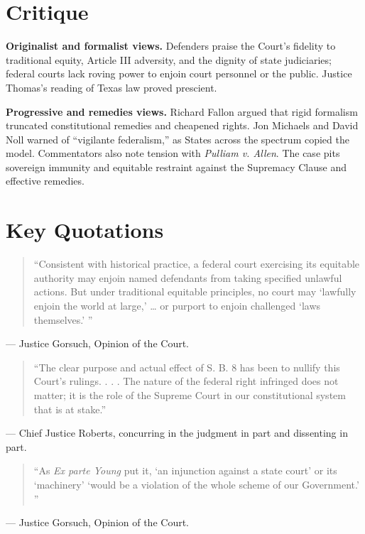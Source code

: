 \documentclass[12pt]{article}
\begin{document}
\section{Critique}

\textbf{Originalist and formalist views.} Defenders praise the Court's fidelity to traditional equity, Article III adversity, and the dignity of state judiciaries; federal courts lack roving power to enjoin court personnel or the public. Justice Thomas's reading of Texas law proved prescient.

\textbf{Progressive and remedies views.} Richard Fallon argued that rigid formalism truncated constitutional remedies and cheapened rights. Jon Michaels and David Noll warned of ``vigilante federalism,'' as States across the spectrum copied the model. Commentators also note tension with \textit{Pulliam v. Allen}. The case pits sovereign immunity and equitable restraint against the Supremacy Clause and effective remedies.

\section{Key Quotations}

\begin{quote}
``Consistent with historical practice, a federal court exercising its equitable authority may enjoin named defendants from taking specified unlawful actions. But under traditional equitable principles, no court may `lawfully enjoin the world at large,' \dots{} or purport to enjoin challenged `laws themselves.' ''
\end{quote}
\noindent --- Justice Gorsuch, Opinion of the Court.

\begin{quote}
``The clear purpose and actual effect of S. B. 8 has been to nullify this Court's rulings. . . . The nature of the federal right infringed does not matter; it is the role of the Supreme Court in our constitutional system that is at stake.''
\end{quote}
\noindent --- Chief Justice Roberts, concurring in the judgment in part and dissenting in part.

\begin{quote}
``As \textit{Ex parte Young} put it, `an injunction against a state court' or its `machinery' `would be a violation of the whole scheme of our Government.' ''
\end{quote}
\noindent --- Justice Gorsuch, Opinion of the Court.
\end{document}
